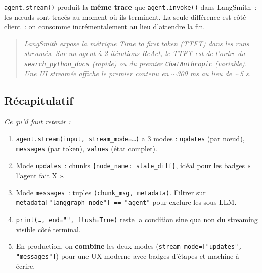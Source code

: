 \documentclass[11pt,a4paper]{article}
\begin{document}
\texttt{agent.stream()} produit la \textbf{même trace} que
\texttt{agent.invoke()} dans LangSmith~: les nœuds sont tracés au moment
où ils terminent. La seule différence est côté client~: on consomme
incrémentalement au lieu d'attendre la fin.

\begin{quote}\itshape
LangSmith expose la métrique \emph{Time to first token (TTFT)} dans les
runs streamés. Sur un agent à 2 itérations ReAct, le TTFT est de
l'ordre du \texttt{search\_python\_docs} (rapide) ou du premier
\texttt{ChatAnthropic} (variable). Une UI streamée affiche le premier
contenu en $\sim$300 ms au lieu de $\sim$5 s.
\end{quote}

\subsection*{Récapitulatif}
{\itshape\sloppy
\textit{Ce qu'il faut retenir :}
\begin{enumerate}[leftmargin=*]
  \item \texttt{agent.stream(input, stream\_mode=\dots)} a 3 modes :
        \texttt{updates} (par nœud), \texttt{messages} (par token),
        \texttt{values} (état complet).
  \item Mode \texttt{updates}~: chunks \texttt{\{node\_name: state\_diff\}},
        idéal pour les badges « l'agent fait X ».
  \item Mode \texttt{messages}~: tuples \texttt{(chunk\_msg, metadata)}.
        Filtrer sur \texttt{metadata["langgraph\_node"] == "agent"}
        pour exclure les sous-LLM.
  \item \texttt{print(\dots, end="", flush=True)} reste la condition
        sine qua non du streaming visible côté terminal.
  \item En production, on \textbf{combine} les deux modes
        (\texttt{stream\_mode=["updates", "messages"]}) pour une UX
        moderne avec badges d'étapes et machine à écrire.
\end{enumerate}
\par}
\end{document}
